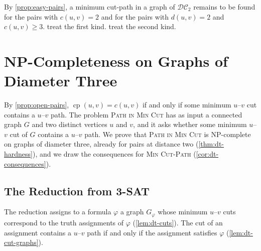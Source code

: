 \documentclass[pdflatex,sn-mathphys-num]{sn-jnl}%
\theoremstyle{thmstyleone}%
\theoremstyle{thmstyletwo}%
\theoremstyle{thmstylethree}%
\newcommand{\cp}{\operatorname{cp}}%
\newcommand{\DC}{\mathcal{DC}_2}%
\newcommand{\MinCutPath}{\textsc{Min Cut-Path}}%
\newcommand{\PathInMinCut}{\textsc{Path in Min Cut}}%
\begin{document}
By \cref{prop:easy-pairs}, a minimum cut-path in a graph of $\DC$ remains to be found for the pairs with $c(u, v) = 2$ and for the pairs with $d(u, v) = 2$ and $c(u, v) \geq 3$.
 treat the first kind.
 treat the second kind.

\section{NP-Completeness on Graphs of Diameter Three}
\label{sec:dt-diameter-three}

By \cref{prop:open-pairs}, $\cp(u, v) = c(u, v)$ if and only if some minimum $u$--$v$ cut contains a $u$--$v$ path.
The problem \PathInMinCut{} has as input a connected graph $G$ and two distinct vertices $u$ and $v$, and it asks whether some minimum $u$--$v$ cut of $G$ contains a $u$--$v$ path.
We prove that \PathInMinCut{} is NP-complete on graphs of diameter three, already for pairs at distance two (\cref{thm:dt-hardness}), and we draw the consequences for \MinCutPath{} (\cref{cor:dt-consequences}).

\subsection{The Reduction from 3-SAT}
\label{sec:dt-construction}

The reduction assigns to a formula $\varphi$ a graph $G_\varphi$ whose minimum $u$--$v$ cuts correspond to the truth assignments of $\varphi$ (\cref{lem:dt-cuts}).
The cut of an assignment contains a $u$--$v$ path if and only if the assignment satisfies $\varphi$ (\cref{lem:dt-cut-graphs}).
\end{document}
